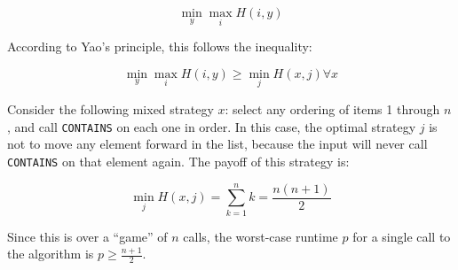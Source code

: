 \documentclass[fleqn]{homework}
\begin{document}
\begin{problem}{3}
\begin{enumerate}[a.]
      \begin{equation*}
        \min_y \max_i H(i,y)
      \end{equation*}

      According to Yao's principle, this follows the inequality:

      \begin{equation*}
        \min_y \max_i H(i,y) \ge \min_j H(x,j) \forall x
      \end{equation*}

      Consider the following mixed strategy $x$: select any ordering of items 1
      through $n$, and call \texttt{CONTAINS} on each one in order.  In this
      case, the optimal strategy $j$ is not to move any element forward in the
      list, because the input will never call \texttt{CONTAINS} on that element
      again.  The payoff of this strategy is:

      \begin{equation*}
        \min_j H(x, j) = \sum_{k=1}^n k = \frac{n(n+1)}{2}
      \end{equation*}

      Since this is over a ``game'' of $n$ calls, the worst-case runtime $p$ for
      a single call to the algorithm is $p \ge \frac{n+1}{2}$.
    \end{enumerate}
  \end{problem}
\end{document}
